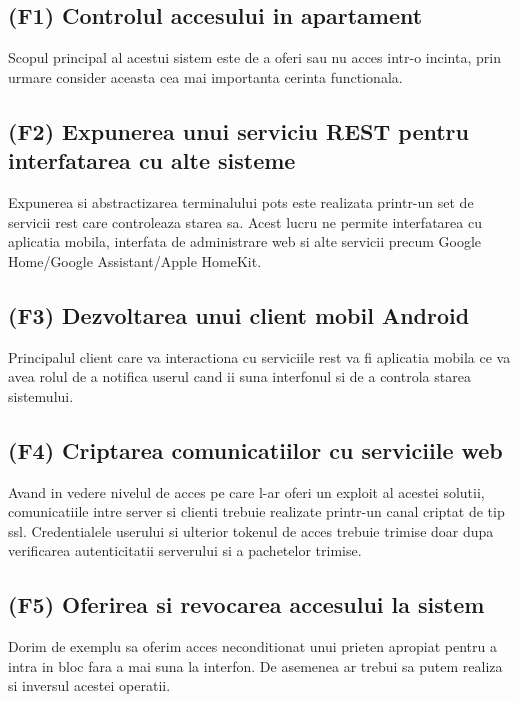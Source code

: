 \subsection{(F1) Controlul accesului in apartament}

Scopul principal al acestui sistem este de a oferi sau nu acces intr-o incinta, prin urmare consider aceasta cea mai importanta cerinta functionala.

\subsection{(F2) Expunerea unui serviciu REST pentru interfatarea cu alte sisteme}

Expunerea si abstractizarea terminalului \acrshort{pots} este realizata printr-un set de servicii \acrfull{rest} care controleaza starea sa. Acest lucru ne permite interfatarea cu aplicatia mobila, interfata de administrare web si alte servicii precum Google Home/Google Assistant/Apple HomeKit.

\subsection{(F3) Dezvoltarea unui client mobil Android}

Principalul client care va interactiona cu serviciile \acrshort{rest} va fi aplicatia mobila ce va avea rolul de a notifica userul cand ii suna interfonul si de a controla starea sistemului.

\subsection{(F4) Criptarea comunicatiilor cu serviciile web}

Avand in vedere nivelul de acces pe care l-ar oferi un exploit al acestei solutii, comunicatiile intre server si clienti trebuie realizate printr-un canal criptat de tip \acrfull{ssl}. Credentialele userului si ulterior tokenul de acces trebuie trimise doar dupa verificarea autenticitatii serverului si a pachetelor trimise.

\subsection{(F5) Oferirea si revocarea accesului la sistem}

Dorim de exemplu sa oferim acces neconditionat unui prieten apropiat pentru a intra in bloc fara a mai suna la interfon. De asemenea ar trebui sa putem realiza si inversul acestei operatii.


